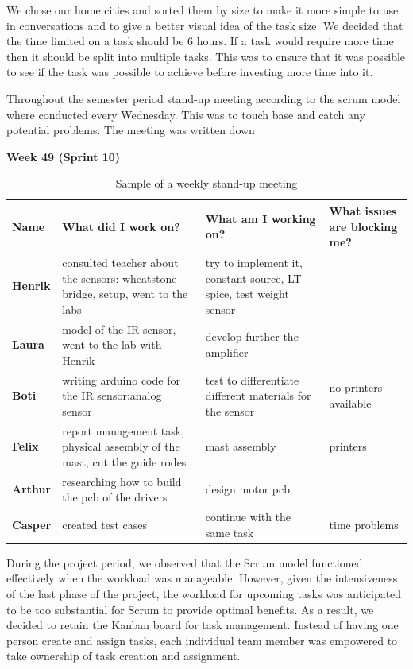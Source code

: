 \documentclass[../report.tex]{subfiles}
\begin{document}
We chose our home cities and sorted them by size to make it more simple to use
in conversations and to give a better visual idea of the task size. We decided
that the time limited on a task should be 6 hours. If a task would require more
time then it should be split into multiple tasks. This was to ensure that it
was possible to see if the task was possible to achieve before investing more
time into it.

Throughout the semester period stand-up meeting according to the scrum model
where conducted every Wednesday. This was to touch base and catch any potential
problems. The meeting was written down 

\textbf{Week 49 (Sprint 10)}
\begin{table}[H]
    \begin{center}
        \begin{tabularx}{\linewidth}{L|L|L|L}
            
            \textbf{Name} & \textbf{What did I work on?} & \textbf{What am I working on? }& \textbf{What issues are blocking me?} \\
            \hline
            \textbf{Henrik} & consulted teacher about the sensors: wheatstone bridge, setup, went to the labs & try to implement it, constant source, LT spice, test weight sensor &  \\
            \hline
            \textbf{Laura} & model of the IR sensor, went to the lab with Henrik & develop further the amplifier  & \\
            \hline
            \textbf{Boti} & writing arduino code for the IR sensor:analog sensor & test to differentiate different materials for the sensor & no printers available\\
            \hline
            \textbf{Felix} & report management task, physical assembly of the mast, cut the guide rodes & mast assembly & printers \\
            \hline
            \textbf{Arthur} & researching how to build the pcb of the drivers & design motor pcb & \\
            \hline
            \textbf{Casper} & created test cases & continue with the same task & time problems
        \end{tabularx}
    \end{center}
    \caption{Sample of a weekly stand-up meeting}
\end{table}

During the project period, we observed that the Scrum model functioned
effectively when the workload was manageable. However, given the intensiveness
of the last phase of the project, the workload for upcoming tasks was
anticipated to be too substantial for Scrum to provide optimal benefits. As a
result, we decided to retain the Kanban board for task management. Instead of
having one person create and assign tasks, each individual team member was
empowered to take ownership of task creation and assignment.
\end{document}
